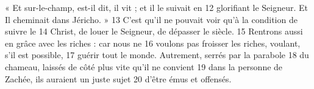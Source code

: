 « Et sur-le-champ, est-il dit, il vit ; et il le suivait en	 
12	 	glorifiant le Seigneur. Et Il cheminait dans Jéricho. »	 
13	 	C'est qu'il ne pouvait voir qu'à la condition de suivre le	 
14	 	Christ, de louer le Seigneur, de dépasser le siècle.	 
15	 	Rentrons aussi en grâce avec les riches : car nous ne	 
16	 	voulons pas froisser les riches, voulant, s'il est possible,	 
17	 	guérir tout le monde. Autrement, serrés par la parabole	 
18	 	du chameau, laissés de côté plus vite qu'il ne convient	 
19	 	dans la personne de Zachée, ils auraient un juste sujet	 
20	 	d'être émus et offensés.